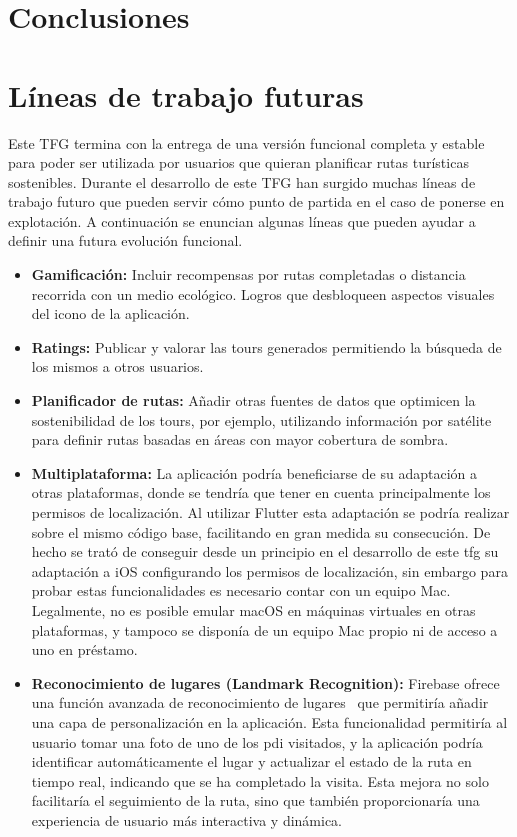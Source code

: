 \section*{Conclusiones}
\section*{Líneas de trabajo futuras}
Este TFG termina con la entrega de una versión funcional completa y estable para poder ser utilizada por usuarios que quieran planificar rutas turísticas sostenibles. Durante el desarrollo de este TFG han surgido muchas líneas de trabajo futuro que pueden servir cómo punto de partida en el caso de ponerse en explotación. A continuación se enuncian algunas líneas que pueden ayudar a definir una futura evolución funcional.
\begin{itemize}
    \item \textbf{Gamificación:} Incluir recompensas por rutas completadas o distancia recorrida con un medio ecológico. Logros que desbloqueen aspectos visuales del icono de la aplicación.
    \item \textbf{Ratings:} Publicar y valorar las tours generados permitiendo la búsqueda de los mismos a otros usuarios.
    \item \textbf{Planificador de rutas:} Añadir otras fuentes de datos que optimicen la sostenibilidad de los tours, por ejemplo, utilizando información por satélite para definir rutas basadas en áreas con mayor cobertura de sombra.
    \item \textbf{Multiplataforma:} La aplicación podría beneficiarse de su adaptación a otras plataformas, donde se tendría que tener en cuenta principalmente los permisos de localización. Al utilizar Flutter esta adaptación se podría realizar sobre el mismo código base, facilitando en gran medida su consecución. De hecho se trató de conseguir desde un principio en el desarrollo de este \acrlong{tfg} su adaptación a iOS configurando los permisos de localización, sin embargo para probar estas funcionalidades es necesario contar con un equipo Mac. Legalmente, no es posible emular macOS en máquinas virtuales en otras plataformas, y tampoco se disponía de un equipo Mac propio ni de acceso a uno en préstamo. 
	\item \textbf{Reconocimiento de lugares (Landmark Recognition):} Firebase ofrece una función avanzada de reconocimiento de lugares~\cite{firebase_mlkit_landmarks} que permitiría añadir una capa de personalización en la aplicación. Esta funcionalidad permitiría al usuario tomar una foto de uno de los \acrlong{pdi} visitados, y la aplicación podría identificar automáticamente el lugar y actualizar el estado de la ruta en tiempo real, indicando que se ha completado la visita. Esta mejora no solo facilitaría el seguimiento de la ruta, sino que también proporcionaría una experiencia de usuario más interactiva y dinámica.

\end{itemize}
